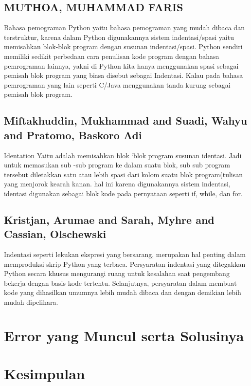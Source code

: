 \documentclass[12pt]{article}
\begin{document}
\subsection{MUTHOA, MUHAMMAD FARIS}
Bahasa pemograman Python yaitu bahasa pemograman yang mudah dibaca dan terstruktur, karena dalam Python digunakannya sistem indentasi/spasi yaitu memisahkan blok-blok program dengan susunan indentasi/spasi. Python sendiri memiliki sedikit perbedaan cara penulisan kode program dengan bahasa pemrograman lainnya, yakni di Python kita hanya menggunakan spasi sebagai pemisah blok program yang biasa disebut sebagai Indentasi. Kalau pada bahasa pemrograman yang lain seperti C/Java menggunakan tanda kurung sebagai pemisah blok program\cite{muthoa2017sistem}.

\subsection{Miftakhuddin, Mukhammad and Suadi, Wahyu and Pratomo, Baskoro Adi}
Identation Yaitu adalah memisahkan blok `blok program susunan identasi. Jadi untuk memasukan sub -sub program ke dalam suatu blok, sub sub program tersebut diletakkan satu atau lebih spasi dari kolom suatu blok program(tulisan yang menjorok kearah kanan. hal ini karena digunakannya sistem indentasi, identasi digunakan sebagai blok kode pada pernyataan seperti if, while, dan for\cite{miftakhuddinimplementasi}. 

\subsection{Kristjan, Arumae and Sarah, Myhre and Cassian, Olschewski}
Indentasi seperti lekukan ekspresi yang bersarang, merupakan hal penting dalam memproduksi skrip Python yang terbaca. Persyaratan indentasi yang ditegakkan Python secara khusus mengurangi ruang untuk kesalahan saat pengembang bekerja dengan basis kode tertentu. Selanjutnya, persyaratan dalam membuat kode yang dihasilkan umumnya lebih mudah dibaca dan dengan demikian lebih mudah dipelihara\cite{kristjansoccer}.


\section{Error yang Muncul serta Solusinya}


\section{Kesimpulan}
\end{document}
